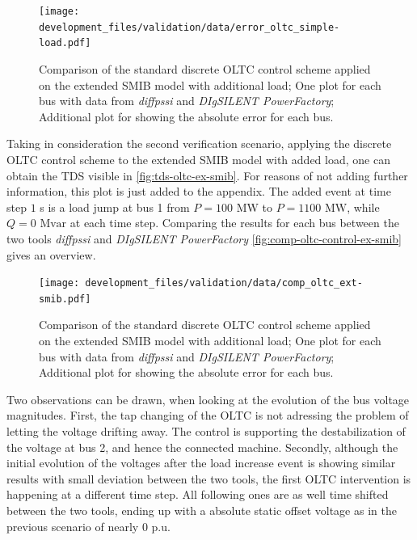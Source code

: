 \begin{figure}[htb!]
    \centering
    \texttt{[image: development\_files/validation/data/error\_oltc\_simple-load.pdf]}
    \caption[Bus and Error Comparison for the standard discrete \acs{OLTC} scheme applied on the extended \acs{SMIB} model with load]{Comparison of the standard discrete \acs{OLTC} control scheme applied on the extended \acs{SMIB} model with additional load; One plot for each bus with data from \textit{diffpssi} and \textit{DIgSILENT PowerFactory}; Additional plot for showing the absolute error for each bus.}
    \label{fig:comp-oltc-error-simple}
\end{figure}

Taking in consideration the second verification scenario, applying the discrete \acs{OLTC} control scheme to the extended \acs{SMIB} model with added load, one can obtain the \acs{TDS} visible in \autoref{fig:tds-oltc-ex-smib}.
For reasons of not adding further information, this plot is just added to the appendix.
The added event at time step $1$ s is a load jump at bus 1 from $P=100\text{ MW}$ to $P=1100\text{ MW}$, while $Q=0\text{ Mvar}$ at each time step.
Comparing the results for each bus between the two tools \textit{diffpssi} and \textit{DIgSILENT PowerFactory} \autoref{fig:comp-oltc-control-ex-smib} gives an overview.

\begin{figure}[htb!]
    \centering
    \texttt{[image: development\_files/validation/data/comp\_oltc\_ext-smib.pdf]}
    \caption[Bus and Error Comparison for the standard discrete \acs{OLTC} scheme applied on the extended \acs{SMIB} model with load]{Comparison of the standard discrete \acs{OLTC} control scheme applied on the extended \acs{SMIB} model with additional load; One plot for each bus with data from \textit{diffpssi} and \textit{DIgSILENT PowerFactory}; Additional plot for showing the absolute error for each bus.}
    \label{fig:comp-oltc-control-ex-smib}
\end{figure}

Two observations can be drawn, when looking at the evolution of the bus voltage magnitudes.
First, the tap changing of the \acs{OLTC} is not adressing the problem of letting the voltage drifting away.
The control is supporting the destabilization of the voltage at bus 2, and hence the connected machine.
Secondly, although the initial evolution of the voltages after the load increase event is showing similar results with small deviation between the two tools, the first \acs{OLTC} intervention is happening at a different time step.
All following ones are as well time shifted between the two tools, ending up with a absolute static offset voltage as in the previous scenario of nearly $0$ p.u.


